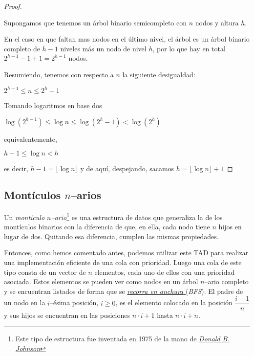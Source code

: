 \begin{proof}$ $
	
	Supongamos que tenemos un árbol binario semicompleto con $n$ nodos y altura $h$.
	
	En el caso en que faltan mas nodos en el último nivel, el árbol es un árbol binario completo de $h - 1$ niveles más un nodo de nivel $h$, por lo que hay en total $2^{h - 1} - 1 + 1 = 2^{h - 1}$ nodos.
	
	Resumiendo, tenemos con respecto a $n$ la siguiente desigualdad:
	\begin{center}
		$2^{h - 1} \leq n \leq 2^h - 1$
	\end{center}
	
	Tomando logaritmos en base dos
	
	\begin{center}
		$\log(2^{h - 1}) \leq \log n \leq \log(2^h - 1) < \log(2^h)$
	\end{center}
	
	equivalentemente,
	
	\begin{center}
		$h - 1 \leq \log n < h$
	\end{center}
	
	es decir, $h - 1 = \lfloor \log n \rfloor $ y de aquí, despejando, sacamos $h = \lfloor \log n \rfloor + 1$ 
\end{proof}

\subsection{Montículos \hbox{\boldmath $n$\unboldmath}--arios}
\begin{defi}
	Un \textit{montículo $n$--ario}\footnote{Este tipo de estructura fue inventada en 1975 de la mano de \href{https://en.wikipedia.org/wiki/Donald_B._Johnson}{\textcolor{hyperlinkColour}{\textit{Donald B. Johnson}}}} es una estructura de datos que generaliza la de los montículos binarios con la diferencia de que, en ella, cada nodo tiene $n$ hijos en lugar de dos. Quitando esa diferencia, cumplen las mismas propiedades.
\end{defi}

Entonces, como hemos comentado antes, podemos utilizar este TAD para realizar una implementación eficiente de una cola con prioridad. Luego una cola de este tipo consta de un vector de $n$ elementos, cada uno de ellos con una prioridad asociada. Estos elementos se pueden ver como nodos en un árbol $n$--ario completo y se encuentran listados de forma que se \href{https://es.wikipedia.org/wiki/Busqueda_en_anchura}{\textcolor{hyperlinkColour}{\textit{recorra en anchura }}}(\textit{BFS}). El padre de un nodo en la $i$--ésima posición, $i \geq 0$, es el elemento colocado en la posición $\dfrac{i-1}{n}$ y sus hijos se encuentran en las posiciones $n\cdot i + 1$ hasta $n\cdot i + n$.\newline

